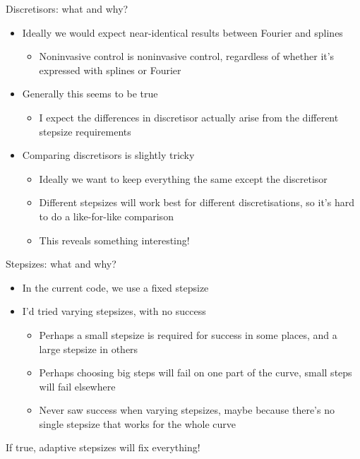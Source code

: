 \documentclass[presentation]{beamer}
\begin{document}
\begin{frame}[label={sec:orgbcaaf11}]{Discretisors: what and why?}
\begin{itemize}
\item Ideally we would expect near-identical results between Fourier and splines
\begin{itemize}
\item Noninvasive control is noninvasive control, regardless of whether it's expressed with splines or Fourier
\end{itemize}
\item Generally this seems to be true
\begin{itemize}
\item I expect the differences in discretisor actually arise from the different stepsize requirements
\end{itemize}
\item Comparing discretisors is slightly tricky
\begin{itemize}
\item Ideally we want to keep everything the same except the discretisor
\item Different stepsizes will work best for different discretisations, so it's hard to do a like-for-like comparison
\item This reveals something interesting!
\end{itemize}
\end{itemize}
\end{frame}

\begin{frame}[label={sec:orgdeaafd5}]{Stepsizes: what and why?}
\begin{itemize}
\item In the current code, we use a fixed stepsize
\item I'd tried varying stepsizes, with no success
\begin{itemize}
\item Perhaps a small stepsize is required for success in some places, and a large stepsize in others
\item Perhaps choosing big steps will fail on one part of the curve, small steps will fail elsewhere
\item Never saw success when varying stepsizes, maybe because there's no single stepsize that works for the whole curve
\end{itemize}
\end{itemize}
\vfill
 \alert{If true, adaptive stepsizes will fix everything!}
\end{frame}
\end{document}

